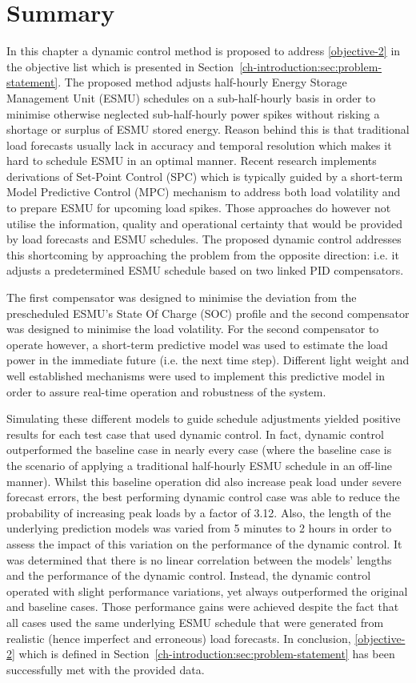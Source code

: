 \section{Summary}
\label{ch2:sec:summary}

In this chapter a dynamic control method is proposed to address \ref{objective-2} in the objective list which is presented in Section~\ref{ch-introduction:sec:problem-statement}.
The proposed method adjusts half-hourly Energy Storage Management Unit (ESMU) schedules on a sub-half-hourly basis in order to minimise otherwise neglected sub-half-hourly power spikes without risking a shortage or surplus of ESMU stored energy.
Reason behind this is that traditional load forecasts usually lack in accuracy and temporal resolution which makes it hard to schedule ESMU in an optimal manner.
Recent research implements derivations of Set-Point Control (SPC) which is typically guided by a short-term Model Predictive Control (MPC) mechanism to address both load volatility and to prepare ESMU for upcoming load spikes.
Those approaches do however not utilise the information, quality and operational certainty that would be provided by load forecasts and ESMU schedules.
The proposed dynamic control addresses this shortcoming by approaching the problem from the opposite direction: i.e. it adjusts a predetermined ESMU schedule based on two linked PID compensators.

The first compensator was designed to minimise the deviation from the prescheduled ESMU's State Of Charge (SOC) profile and the second compensator was designed to minimise the load volatility.
For the second compensator to operate however, a short-term predictive model was used to estimate the load power in the immediate future (i.e. the next time step).
Different light weight and well established mechanisms were used to implement this predictive model in order to assure real-time operation and robustness of the system.

Simulating these different models to guide schedule adjustments yielded positive results for each test case that used dynamic control.
In fact, dynamic control outperformed the baseline case in nearly every case (where the baseline case is the scenario of applying a traditional half-hourly ESMU schedule in an off-line manner).
Whilst this baseline operation did also increase peak load under severe forecast errors, the best performing dynamic control case was able to reduce the probability of increasing peak loads by a factor of 3.12.
Also, the length of the underlying prediction models was varied from 5 minutes to 2 hours in order to assess the impact of this variation on the performance of the dynamic control.
It was determined that there is no linear correlation between the models' lengths and the performance of the dynamic control.
Instead, the dynamic control operated with slight performance variations, yet always outperformed the original and baseline cases.
Those performance gains were achieved despite the fact that all cases used the same underlying ESMU schedule that were generated from realistic (hence imperfect and erroneous) load forecasts.
In conclusion, \ref{objective-2} which is defined in Section~\ref{ch-introduction:sec:problem-statement} has been successfully met with the provided data.

